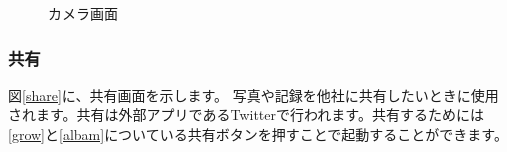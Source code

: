 \documentclass[a4j]{jarticle}
\begin{document}
\begin{figure}[H]
    \begin{center}
    \caption {カメラ画面}
    \label{Camera}
    \end{center}
\end{figure}


\subsubsection{共有}
図\ref{share}に、共有画面を示します。
写真や記録を他社に共有したいときに使用されます。共有は外部アプリであるTwitterで行われます。共有するためには\ref{grow}と\ref{albam}についている共有ボタンを押すことで起動することができます。
\end{document}
